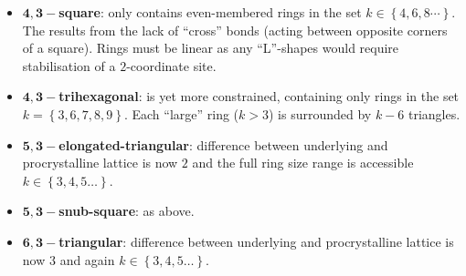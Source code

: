 \begin{itemize}
	\item $\mathbf{4,3-}$\textbf{square}: only contains even\--membered rings in the set $k\in\left\{4,6,8\cdots\right\}$. The results from the lack of ``cross'' bonds (acting between opposite corners of a square). Rings must be linear as any ``L''\--shapes would require stabilisation of a $2$\--coordinate site. 
	\item $\mathbf{4,3-}$\textbf{trihexagonal}: is yet more constrained, containing only rings in the set $k=\left\{3,6,7,8,9\right\}$. Each ``large'' ring ($k>3$) is surrounded by $k-6$ triangles.
	\item $\mathbf{5,3-}$\textbf{elongated\--triangular}: difference between underlying and procrystalline lattice is now $2$ and the full ring size range is accessible $k\in\left\{3,4,5\dots\right\}$.
	\item $\mathbf{5,3-}$\textbf{snub\--square}: as above.
	\item $\mathbf{6,3-}$\textbf{triangular}: difference between underlying and procrystalline lattice is now $3$ and again $k\in\left\{3,4,5\dots\right\}$.	
\end{itemize}

